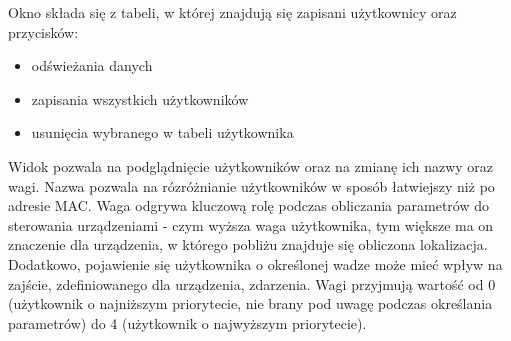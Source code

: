 \documentclass{article}
\begin{document}
		Okno składa się z tabeli, w której znajdują się zapisani użytkownicy oraz przycisków:
		\begin{itemize}
			\item odświeżania danych
			\item zapisania wszystkich użytkowników
			\item usunięcia wybranego w tabeli użytkownika
		\end{itemize}
		Widok pozwala na podglądnięcie użytkowników oraz na zmianę ich nazwy oraz wagi. Nazwa pozwala na rózróżnianie użytkowników w sposób łatwiejszy niż po adresie MAC. Waga odgrywa kluczową rolę podczas obliczania parametrów do sterowania urządzeniami - czym wyższa waga użytkownika, tym większe ma on znaczenie dla urządzenia, w którego pobliżu znajduje się obliczona lokalizacja. Dodatkowo, pojawienie się użytkownika o określonej wadze może mieć wpływ na zajście, zdefiniowanego dla urządzenia, zdarzenia. Wagi przyjmują wartość od 0 (użytkownik o najniższym priorytecie, nie brany pod uwagę podczas określania parametrów) do 4 (użytkownik o najwyższym priorytecie).
\end{document}
